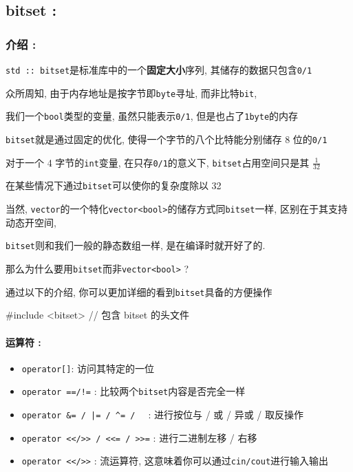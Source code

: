 
\subsection{bitset :}

\subsubsection{介绍 :}

\texttt{std :: bitset}是标准库中的一个\textbf{固定大小}序列, 其储存的数据只包含\texttt{0/1}

众所周知, 由于内存地址是按字节即\texttt{byte}寻址, 而非比特\texttt{bit}, 

我们一个\texttt{bool}类型的变量, 虽然只能表示\texttt{0/1}, 但是也占了\texttt{1byte}的内存

\texttt{bitset}就是通过固定的优化, 使得一个字节的八个比特能分别储存 8 位的\texttt{0/1}

对于一个 4 字节的\texttt{int}变量, 在只存\texttt{0/1}的意义下, \texttt{bitset}占用空间只是其 $\frac{1}{32}$

在某些情况下通过\texttt{bitset}可以使你的复杂度除以 32

当然, \texttt{vector}的一个特化\texttt{vector<bool>}的储存方式同\texttt{bitset}一样, 区别在于其支持动态开空间, 

\texttt{bitset}则和我们一般的静态数组一样, 是在编译时就开好了的.

那么为什么要用\texttt{bitset}而非\texttt{vector<bool>} ?

通过以下的介绍, 你可以更加详细的看到\texttt{bitset}具备的方便操作

\begin{cppcode}
#include <bitset>  // 包含 bitset 的头文件
\end{cppcode}

\paragraph{运算符 :}

\begin{itemize}
\item \texttt{operator[]}: 访问其特定的一位
\item \texttt{operator ==/!=} : 比较两个\texttt{bitset}内容是否完全一样
\item \texttt{operator &= / |= / ^= / ~} : 进行按位与 / 或 / 异或 / 取反操作
\item \texttt{operator <</>> / <<= / >>=} : 进行二进制左移 / 右移
\item \texttt{operator <</>>} : 流运算符, 这意味着你可以通过\texttt{cin/cout}进行输入输出
\end{itemize}

